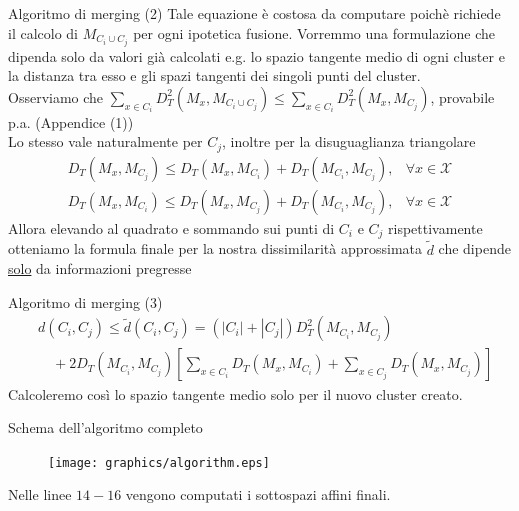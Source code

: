\documentclass[usenames,dvipsnames,9pt]{beamer}
\theoremstyle{definition}
\begin{document}
\begin{frame}{Algoritmo di merging (2)}
Tale equazione è costosa da computare poichè richiede il calcolo di $M_{C_i\cup C_j}$ per ogni ipotetica fusione.
Vorremmo una formulazione che dipenda solo da valori già calcolati e.g. lo spazio tangente medio di ogni cluster e
la distanza tra esso e gli spazi tangenti dei singoli punti del cluster. \\
Osserviamo che $\sum_{x \in C_{i}} D_{T}^{2}\left(M_{x}, M_{C_{i} \cup C_{j}}\right) \leq \sum_{x \in C_{i}} D_{T}^{2}\left(M_{x}, M_{C_{j}}\right)$, provabile p.a. (Appendice (1)) \\
Lo stesso vale naturalmente per $C_j$, inoltre per la disuguaglianza triangolare
\begin{equation*}
  \begin{array}{ll}
    D_{T}\left(M_{x}, M_{C_{j}}\right) \leq D_{T}\left(M_{x}, M_{C_{i}}\right)+D_{T}\left(M_{C_{i}}, M_{C_{j}}\right), & \forall x \in \mathcal{X} \\
    D_{T}\left(M_{x}, M_{C_{i}}\right) \leq D_{T}\left(M_{x}, M_{C_{j}}\right)+D_{T}\left(M_{C_{i}}, M_{C_{j}}\right), & \forall x \in \mathcal{X}
    \end{array}
\end{equation*}
Allora elevando al quadrato e sommando sui punti di $C_i$ e $C_j$ rispettivamente otteniamo la formula finale per la nostra dissimilarità approssimata $\tilde{d}$
che dipende \underline{solo} da informazioni pregresse
\end{frame}

\begin{frame}{Algoritmo di merging (3)}
\begin{equation*}
  \begin{aligned}
    &d\left(C_{i}, C_{j}\right) \leq \tilde{d}\left(C_{i}, C_{j}\right) =\left(\left|C_{i}\right|+\left|C_{j}\right|\right) D_{T}^{2}\left(M_{C_{i}}, M_{C_{j}}\right) \\
    &\quad+2 D_{T}\left(M_{C_{i}}, M_{C_{j}}\right)\left[\sum_{x \in C_{i}} D_{T}\left(M_{x}, M_{C_{i}}\right)+\sum_{x \in C_{j}} D_{T}\left(M_{x}, M_{C_{j}}\right)\right]
  \end{aligned}
\end{equation*}
Calcoleremo così lo spazio tangente medio solo per il nuovo cluster creato.
\end{frame}

\begin{frame}{Schema dell'algoritmo completo}
\begin{figure}[b]
\centering
\texttt{[image: graphics/algorithm.eps]}
\end{figure}
Nelle linee $14-16$ vengono computati i sottospazi affini finali.
\end{frame}
\end{document}
